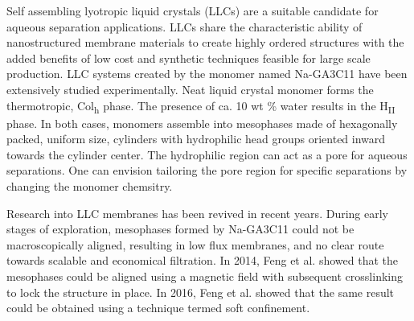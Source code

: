 \documentclass{article}
\begin{document}
  Self assembling lyotropic liquid crystals (LLCs) are a suitable candidate for
  aqueous separation applications. LLCs share the characteristic ability of
  nanostructured membrane materials to create highly ordered structures with the
  added benefits of low cost and synthetic techniques feasible for large scale
  production.  \cite{feng_scalable_2014} LLC systems created by the monomer named
  Na-GA3C11 have been extensively studied experimentally.
  \cite{smith_ordered_1997,zhou_supported_2005,resel_h2-phase_2000,feng_scalable_2014,feng_thin_2016}
  Neat liquid crystal monomer forms the thermotropic, Col\textsubscript{h} phase.
  The presence of ca. 10 wt \% water results in the H\textsubscript{II} phase. In
  both cases, monomers assemble into mesophases made of hexagonally packed,
  uniform size, cylinders with hydrophilic head groups oriented inward towards
  the cylinder center.  The hydrophilic region can act as a pore for aqueous
  separations.  One can envision tailoring the pore region for specific
  separations by changing the monomer chemsitry.

  Research into LLC membranes has been revived in recent years.  During early
  stages of exploration, mesophases formed by Na-GA3C11 could not be
  macroscopically aligned, resulting in low flux membranes, and no clear route
  towards scalable and economical filtration. In 2014, Feng et al. showed that
  the mesophases could be aligned using a magnetic field with subsequent
  crosslinking to lock the structure in place. \cite{feng_scalable_2014} In 2016,
  Feng et al. showed that the same result could be obtained using a technique
  termed soft confinement. \cite{feng_thin_2016}
\end{document}
